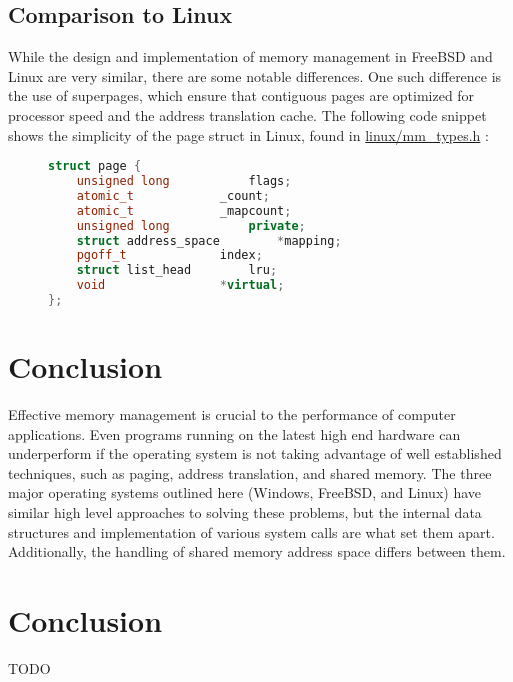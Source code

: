 \documentclass[letterpaper,draftclsnofoot,10pt,onecolumn,titlepage]{IEEEtran}\usepackage[margin=0.75in]{geometry}
\begin{document}
\subsection{Comparison to Linux}
While the design and implementation of memory management in FreeBSD and Linux are very similar, there are 
some notable differences. One such difference is the use of superpages, which ensure that contiguous pages 
are optimized for processor speed and the address translation cache. The following code snippet shows the 
simplicity of the page struct in Linux, found in \url{linux/mm_types.h} \cite{linux}:

\begin{figure}[H]
\begin{lstlisting}[language=C++]
struct page {
	unsigned long 			flags;
	atomic_t			_count;
	atomic_t			_mapcount;
	unsigned long			private;
	struct address_space		*mapping;
	pgoff_t				index;
	struct list_head		lru;
	void				*virtual;
};
\end{lstlisting}
\end{figure}


\section{Conclusion}
Effective memory management is crucial to the performance of computer applications. Even programs 
running on the latest high end hardware can underperform if the operating system is not taking 
advantage of well established techniques, such as paging, address translation, and shared memory.
The three major operating systems outlined here (Windows, FreeBSD, and Linux) have similar high level
approaches to solving these problems, but the internal data structures and implementation of various
system calls are what set them apart. Additionally, the handling of shared memory address space differs
between them.


\section{Conclusion}
TODO




\end{document}
